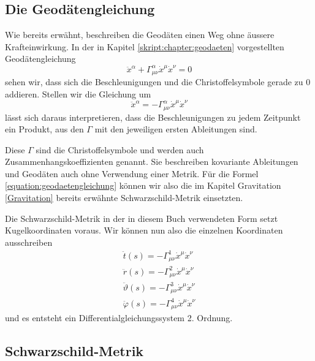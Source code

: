 \begin{refsection}
	\subsection{Die Geodätengleichung}\label{skript:chapter:zeitreisen:geodaetengl}
	Wie bereits erwähnt, beschreiben die Geodäten einen Weg ohne äussere Krafteinwirkung. In der in Kapitel \ref{skript:chapter:geodaeten} vorgestellten Geodätengleichung
	\begin{equation}
	\ddot{x}^{\alpha} + \Gamma^{\alpha}_{\mu\nu}\dot{x}^{\mu}\dot{x}^{\nu} = 0
	\end{equation}
    sehen wir, dass sich die Beschleunigungen und die Christoffelsymbole gerade zu $0$ addieren.
	Stellen wir die Gleichung um	
	\begin{equation}\label{equation:geodaetengleichung}
	\ddot{x}^{\alpha} = -\Gamma^{\alpha}_{\mu\nu}\dot{x}^{\mu}\dot{x}^{\nu}
	\end{equation}
	lässt sich daraus interpretieren, dass die Beschleunigungen zu jedem Zeitpunkt ein Produkt, aus den $\Gamma$ mit den jeweiligen ersten Ableitungen sind.
    
	Diese $\Gamma$ sind die Christoffelsymbole und werden auch Zusammenhangskoeffizienten genannt. Sie beschreiben kovariante Ableitungen und Geodäten auch ohne Verwendung einer Metrik. Für die Formel \eqref{equation:geodaetengleichung} können wir also die im Kapitel Gravitation \ref{Gravitation} bereits erwähnte Schwarzschild-Metrik einsetzten.	
	 
	Die Schwarzschild-Metrik in der in diesem Buch verwendeten Form setzt Kugelkoordinaten voraus. Wir können nun also die einzelnen Koordinaten ausschreiben 	
	\begin{equation}\label{skript:chapter:zeitreisen:geodaeten4dim}
	\begin{aligned}
	\ddot{t}(s) = -\Gamma^{1}_{\mu\nu}\dot{x}^{\mu}\dot{x}^{\nu}\\
	\ddot{r}(s) = -\Gamma^{2}_{\mu\nu}\dot{x}^{\mu}\dot{x}^{\nu}\\
	\ddot{\vartheta}(s) = -\Gamma^{3}_{\mu\nu}\dot{x}^{\mu}\dot{x}^{\nu}\\
	\ddot{\varphi}(s) = -\Gamma^{4}_{\mu\nu}\dot{x}^{\mu}\dot{x}^{\nu}	
	\end{aligned}
	\end{equation}
    und es entsteht ein Differentialgleichungssystem 2. Ordnung.

	\subsection{Schwarzschild-Metrik}\label{skript:chapter:zeitreisen:schwarzschildmetrik}
	

\end{refsection}
